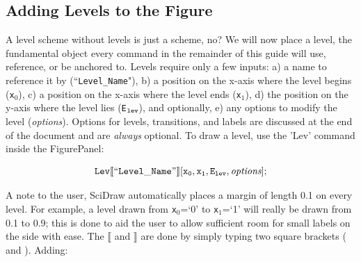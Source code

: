 \documentclass[portrait,10pt]{article}
\begin{document}
\subsection{Adding Levels to the Figure}

A level scheme without levels is just a scheme, no? We will now place a level, the fundamental object every command in the remainder of this guide will use, reference, or be anchored to. Levels require only a few inputs: a) a name to reference it by (``{\tt Level\_Name}"), b) a position on the x-axis where the level begins ({\tt x$_0$}), c) a position on the x-axis where the level ends ({\tt x$_1$}), d) the position on the y-axis where the level lies ({\tt E$_{{\tt lev}}$}), and optionally, e) any options to modify the level (\textit{options}). Options for levels, transitions, and labels are discussed at the end of the document and are \textit{always} optional. To draw a level, use the 'Lev' command inside the FigurePanel:

\begin{equation} \label{eq:Lev}
{\tt Lev\llbracket``Level\_Name"\rrbracket[x_0,x_1,E_{lev},\textit{options}];}
\end{equation}

A note to the user, SciDraw automatically places a margin of length 0.1 on every level. For example, a level drawn from {\tt x$_0$}=`0' to {\tt x$_1$}=`1' will really be drawn from 0.1 to 0.9; this is done to aid the user to allow sufficient room for small labels on the side with ease. The $\llbracket$ and $\rrbracket$ are done by simply typing two square brackets (\keystroke{{\tiny $^\{$[}}\keystroke{{\tiny $^\{$[}} and \keystroke{{\tiny $^\}$]}}\keystroke{{\tiny $^\}$]}}). Adding:
\end{document}
